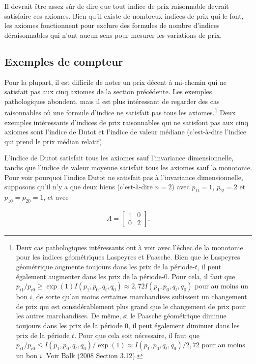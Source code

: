 \documentclass[]{article}
\begin{document}
Il devrait être assez sûr de dire que tout indice de prix raisonnable devrait satisfaire ces axiomes. Bien qu'il existe de nombreux indices de prix qui le font, les axiomes fonctionnent pour exclure des formules de nombre d'indices déraisonnables qui n'ont aucun sens pour mesurer les variations de prix.

\hypertarget{exemples-de-compteur}{%
\subsection{Exemples de compteur}\label{exemples-de-compteur}}

Pour la plupart, il est difficile de noter un prix décent à mi-chemin qui ne satisfait pas aux cinq axiomes de la section précédente. Les exemples pathologiques abondent, mais il est plus intéressant de regarder des cas raisonnables où une formule d'indice ne satisfait pas tous les axiomes.\footnote{Deux cas pathologiques intéressants ont à voir avec l'échec de la monotonie pour les indices géométriques Laspeyres et Paasche. Bien que le Laspeyres géométrique augmente toujours dans les prix de la période-\(t\), il peut également augmenter dans les prix de la période-0. Pour cela, il faut que \(p_{i1} / p_{i0} \geq \exp(1) I(p_{1}, p_{0}, q_{t}, q_{0}) \approx 2,72 I(p_{1}, p_{0}, q_{t}, q_{0})\) pour au moins un bon \(i\), de sorte qu'au moins certaines marchandises subissent un changement de prix qui est considérablement plus grand que le changement de prix pour les autres marchandises. De même, si le Paasche géométrique diminue toujours dans les prix de la période 0, il peut également diminuer dans les prix de la période \(t\). Pour que cela soit nécessaire, il faut que \(p_{i1} / p_{i0} \leq I(p_{1}, p_{0}, q_{t}, q_{0}) / \exp(1) \approx I(p_{1}, p_{0}, q_{t}, q_{0}) / 2,72\) pour au moins un bon \(i\). Voir Balk (2008 Section 3.12).} Deux exemples intéressants d'indices de prix raisonnables qui ne satisfont pas aux cinq axiomes sont l'indice de Dutot et l'indice de valeur médiane (c'est-à-dire l'indice qui prend le prix médian relatif).

L'indice de Dutot satisfait tous les axiomes sauf l'invariance dimensionnelle, tandis que l'indice de valeur moyenne satisfait tous les axiomes sauf la monotonie. Pour voir pourquoi l'indice Dutot ne satisfait pas à l'invariance dimensionnelle, supposons qu'il n'y a que deux biens (c'est-à-dire \(n = 2\)) avec \(p_{1t} = 1\), \(p_{2t} = 2\) et \(p_{10} = p_{20} = 1\), et avec

\begin{align*}
A =
\begin{bmatrix}
1 & 0 \\
0 & 2
\end{bmatrix}.
\end{align*}
\end{document}

